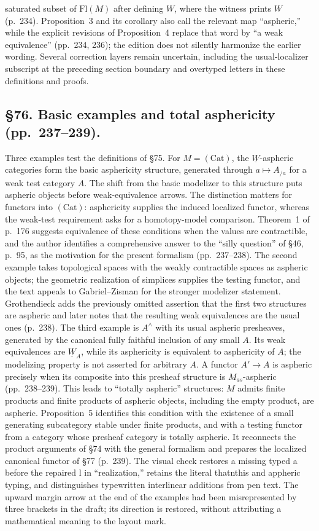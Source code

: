 \documentclass[10pt,oneside]{book}
\begin{document}
saturated subset of $\mathrm{Fl}(M)$ after defining $W$, where the witness prints $W$ (p.\ 234). Proposition~3 and its corollary also call the relevant map “aspheric,” while the explicit revisions of Proposition~4 replace that word by “a weak equivalence” (pp.\ 234, 236); the edition does not silently harmonize the earlier wording. Several correction layers remain uncertain, including the usual-localizer subscript at the preceding section boundary and overtyped letters in these definitions and proofs.

\subsection*{\S76. Basic examples and total asphericity (pp.\ 237--239).}
Three examples test the definitions of \S75. For $M=(\mathrm{Cat})$, the $\underline W$-aspheric categories form the basic asphericity structure, generated through $a\mapsto A_{/a}$ for a weak test category $A$. The shift from the basic modelizer to this structure puts aspheric objects before weak-equivalence arrows. The distinction matters for functors into $(\mathrm{Cat})$: asphericity supplies the induced localized functor, whereas the weak-test requirement asks for a homotopy-model comparison. Theorem~1 of p.\ 176 suggests equivalence of these conditions when the values are contractible, and the author identifies a comprehensive answer to the “silly question” of \S46, p.\ 95, as the motivation for the present formalism (pp.\ 237--238). The second example takes topological spaces with the weakly contractible spaces as aspheric objects; the geometric realization of simplices supplies the testing functor, and the text appeals to Gabriel--Zisman for the stronger modelizer statement. Grothendieck adds the previously omitted assertion that the first two structures are aspheric and later notes that the resulting weak equivalences are the usual ones (p.\ 238). The third example is $A^\wedge$ with its usual aspheric presheaves, generated by the canonical fully faithful inclusion of any small $A$. Its weak equivalences are $\underline W_A$, while its asphericity is equivalent to asphericity of $A$; the modelizing property is not asserted for arbitrary $A$. A functor $A'\to A$ is aspheric precisely when its composite into this presheaf structure is $M_{as}$-aspheric (pp.\ 238--239). This leads to “totally aspheric” structures: $M$ admits finite products and finite products of aspheric objects, including the empty product, are aspheric. Proposition~5 identifies this condition with the existence of a small generating subcategory stable under finite products, and with a testing functor from a category whose presheaf category is totally aspheric. It reconnects the product arguments of \S74 with the general formalism and prepares the localized canonical functor of \S77 (p.\ 239). The visual check restores a missing typed a before the repaired l in “realization,” retains the literal thatnthis and appheric typing, and distinguishes typewritten interlinear additions from pen text. The upward margin arrow at the end of the examples had been misrepresented by three brackets in the draft; its direction is restored, without attributing a mathematical meaning to the layout mark.
\end{document}
